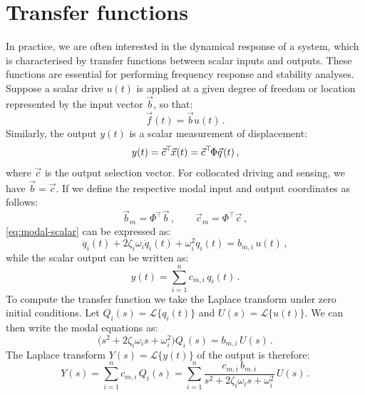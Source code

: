\documentclass[../Thesis-IJspeert.tex]{subfiles}
\begin{document}
\section{Transfer functions}
In practice, we are often interested in the dynamical response of a system, which is characterised by transfer functions between scalar inputs and outputs. These functions are essential for performing frequency response and stability analyses. Suppose a scalar drive $u(t)$ is applied at a given degree of freedom or location represented by the input vector $\vec{b}$, so that:
\begin{equation}
\vec{f}(t) = \vec{b}  u(t)\,.
\end{equation}
Similarly, the output $y(t)$ is a scalar measurement of displacement:
\begin{equation}
y(t) = \vec{c}^{\top} \!\vec{x}(t) = \vec{c}^{\top} \!\Phi  \vec{q}\hspace{0.1em}(t)\,,
\end{equation}
where $\vec{c}$ is the output selection vector. For collocated driving and sensing, we have $\vec{b}=\vec{c}$. If we define the respective modal input and output coordinates as follows:
\begin{equation}
\vec{b}_{m} = \Phi^{\!\top} \vec{b}\,, \qquad \vec{c}_{m} = \Phi^{\!\top} \!\vec{c}\,,
\end{equation}
\autoref{eq:modal-scalar} can be expressed as:
\begin{equation}
\ddot{q}_{i}(t) + 2 \zeta_{i} \omega_{i} \dot{q}_{i}(t) + \omega_{i}^{2} q_{i}(t) = b_{m,i} \, u(t)\,,
\end{equation}
while the scalar output can be written as:
\begin{equation}
y(t) = \sum_{i=1}^{n} c_{m,i} \, q_{i}(t)\,.
\end{equation}
To compute the transfer function we take the Laplace transform under zero initial conditions. Let $Q_{i}(s)=\mathcal{L}\{q_{i}(t)\}$ and $U(s)=\mathcal{L}\{u(t)\}$. We can then write the modal equations as:
\begin{equation}
\bigl(s^{2} + 2 \zeta_{i} \omega_{i} s + \omega_{i}^{2}\bigr) Q_{i}(s) = b_{m,i} \, U(s)\,.
\end{equation}
The Laplace transform $Y(s)=\mathcal{L}\{y(t)\}$ of the output is therefore:
\begin{equation}
Y(s) = \sum_{i=1}^{n} c_{m,i} \, Q_{i}(s) 
= \sum_{i=1}^{n} \frac{c_{m,i} \,b_{m,i}}{s^{2} + 2 \zeta_{i} \omega_{i} s + \omega_{i}^{2}} \, U(s)\,.
\end{equation}
\end{document}
